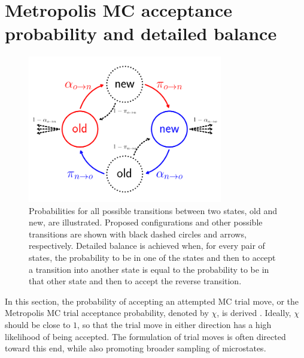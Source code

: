 \documentclass[
  9pt,
  bestpractices,
  pubversion,
]{livecoms}
\begin{document}
\section{\label{sec:detailed_balance}Metropolis MC acceptance probability and detailed balance}

\begin{figure}
\begin{centering}
\includegraphics[width=8.5cm]{../figures/detailed_balance.pdf}
\caption{
Probabilities for all possible transitions between two states, old and new, are illustrated.
Proposed configurations and other possible transitions are shown with black dashed circles and arrows, respectively.
Detailed balance is achieved when, for every pair of states, the probability to be in one of the states and then to accept a transition into another state is equal to the probability to be in that other state and then to accept the reverse transition.
}
\label{fig:detailed_balance}
\end{centering}
\end{figure}

In this section, the probability of accepting an attempted MC trial move, or the Metropolis MC trial acceptance probability, denoted by $\chi$, is derived \cite{metropolis_equation_1953, hastings_monte_1970, kofke_monte_1988, allen_computer_1989, frenkel_understanding_2002}.
Ideally, $\chi$ should be close to $1$, so that the trial move in either direction has a high likelihood of being accepted.
The formulation of trial moves is often directed toward this end, while also promoting broader sampling of microstates.
\end{document}
